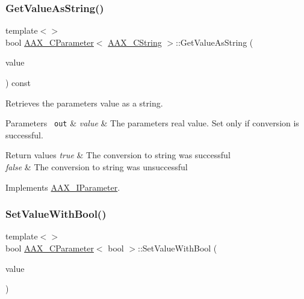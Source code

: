 \subsubsection{\texorpdfstring{GetValueAsString()}{GetValueAsString()}\hspace{0.1cm}{\footnotesize\ttfamily [2/2]}}
{\footnotesize\ttfamily template$<$$>$ \\
bool \mbox{\hyperlink{a01537}{A\+A\+X\+\_\+\+C\+Parameter}}$<$ \mbox{\hyperlink{a01573}{A\+A\+X\+\_\+\+C\+String}} $>$\+::Get\+Value\+As\+String (\begin{DoxyParamCaption}\item[{\mbox{\hyperlink{a01873}{A\+A\+X\+\_\+\+I\+String}} $\ast$}]{value }\end{DoxyParamCaption}) const\hspace{0.3cm}{\ttfamily [virtual]}}



Retrieves the parameter\textquotesingle{}s value as a string. 


\begin{DoxyParams}[1]{Parameters}
\mbox{\texttt{ out}}  & {\em value} & The parameter\textquotesingle{}s real value. Set only if conversion is successful.\\
\hline
\end{DoxyParams}

\begin{DoxyRetVals}{Return values}
{\em true} & The conversion to string was successful \\
\hline
{\em false} & The conversion to string was unsuccessful \\
\hline
\end{DoxyRetVals}


Implements \mbox{\hyperlink{a01857_ab0d640c37120decbbe48f0c1483770f9}{A\+A\+X\+\_\+\+I\+Parameter}}.

\mbox{\label{a01537_aa741c6432107eab6bf8796833a6f2cde}} 
\subsubsection{\texorpdfstring{SetValueWithBool()}{SetValueWithBool()}\hspace{0.1cm}{\footnotesize\ttfamily [2/2]}}
{\footnotesize\ttfamily template$<$$>$ \\
bool \mbox{\hyperlink{a01537}{A\+A\+X\+\_\+\+C\+Parameter}}$<$ bool $>$\+::Set\+Value\+With\+Bool (\begin{DoxyParamCaption}\item[{bool}]{value }\end{DoxyParamCaption})\hspace{0.3cm}{\ttfamily [virtual]}}



